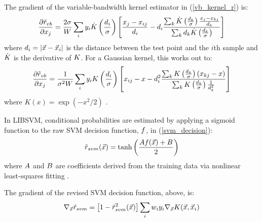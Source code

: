 \documentclass{article}
\begin{document}
The gradient of the variable-bandwidth kernel estimator in 
(\ref{vb_kernel_r}) is:
\begin{equation}
	\frac{\partial \tilde r_{vb}}{\partial x_j} = 
	\frac{2 \sigma}{W} \sum_i y_i
	\dot {K} \left (\frac{d_i}{\sigma} \right )
	\left [\frac{x_j - x_{ij}}{d_i} 
	- d_i \frac{\sum_k \dot {K} \left (\frac{d_k}{\sigma} \right )
	\frac{x_j - x_{kj}}{d_k}}
{\sum_k d_k \dot {K} \left (\frac{d_k}{\sigma} \right )} \right ]
\end{equation}
where $d_i=|\vec {x} - \vec {x}_i|$ is the distance between the 
test point and the $i$th sample and $\dot {K}$ is the derivative
of $K$.
For a Gaussian kernel, this works out to:
\begin{equation}
	\frac{\partial \tilde r_{vb}}{\partial x_j} = 
	\frac{1}{\sigma^2 W} \sum_i y_i
	K \left (\frac{d_i}{\sigma} \right )
	\left [x_{ij} - x
	- d_i^2 \frac{\sum_k K \left (\frac{d_k}{\sigma} \right )
	\left (x_{kj} - x \right )}
{\sum_k K \left (\frac{d_k}{\sigma} \right )\frac{1}{d_k^2}} \right ]
\end{equation}
where $K(x)=\exp(-x^2/2)$ \citep{Mills2011}.

In LIBSVM, conditional probabilities are estimated by applying a
sigmoid function to
the raw SVM decision function, $f$, in (\ref{svm_decision}):
\begin{equation}
	\tilde r_{svm}(\vec {x}) = \tanh \left (\frac{A f(\vec {x})+ B}{2} \right )
\end{equation}
where $A$ and $B$ are coefficients derived from
the training data via
nonlinear least-squares fitting \citep{Lin_etal2007, Chang_Lin2011}.

The gradient of the revised SVM decision function, above, is:
\begin{equation}
	\nabla_{\vec {x}} {\tilde r_{svm}} = \left [1 - \tilde r_{svm}^2(\vec {x}) \right ] \sum_i w_i y_i \nabla_{\vec {x}} K(\vec {x}, \vec {x}_i)
\end{equation}
\end{document}
